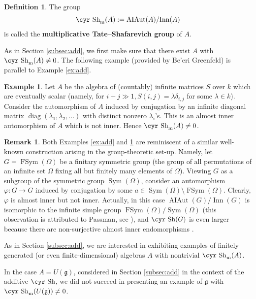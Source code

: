 \documentclass[11pt,reqno]{amsart}
\numberwithin{equation}{section}
\theoremstyle{definition}
\newtheorem{example}[theorem]{Example}
\newtheorem{definition}[theorem]{Definition}
\newtheorem{remark}[theorem]{Remark}
\newcommand{\Inner}{{\operatorname{ Inn}}}
\newcommand{\AIAut}{{\operatorname{ AIAut}}}
\newcommand{\diag}{{\operatorname{ diag}}}
\newcommand{\Sym}{{\operatorname{ Sym}}}
\newcommand{\FSym}{{\operatorname{ FSym}}}
\def\Sha{\text{\cyr Sh}}
\def\g{\mathfrak g}
\begin{document}
\begin{definition}
The group $$\Sha_{\text{\rm{m}}}(A):=\AIAut(A)/\Inner (A)$$
is called the {\bf {multiplicative Tate--Shafarevich group}} of $A$.
\end{definition}


As in Section \ref{subsec:add}, we first make sure that there exist $A$ with
$\Sha_{\text{\rm{m}}}(A)\ne 0$. The following example (provided by Be'eri
Greenfeld) is parallel to Example \ref{ex:add}.


\begin{example} \label{ex:mult}
Let $A$ be the algebra of (countably) infinite matrices $S$ over
$k$ which are eventually scalar (namely, for $i+j\gg 1, S(i,j)=\lambda \delta_{i,j}$ for some $\lambda\in k$).
Consider the automorphism of $A$ induced by conjugation by an infinite diagonal matrix
$\diag(\lambda_1,\lambda_2,\dots)$ with distinct nonzero $\lambda_i$'s.
This is an almost inner automorphism of $A$ which is not inner. Hence $\Sha_{\text{\rm{m}}}(A)\ne 0$.
\end{example}

\begin{remark}
Both Examples \ref{ex:add} and \ref{ex:mult} are reminiscent of a similar well-known construction arising in the group-theoretic
set-up. Namely, let $G=\FSym(\Omega )$ be a finitary symmetric group (the group of all permutations of an infinite set $\Omega$
fixing all but finitely many elements of $\Omega$). Viewing $G$ as a subgroup of the symmetric group $\Sym (\Omega)$, consider
an automorphism $\varphi\colon G\to G$ induced by conjugation by some $a\in \Sym (\Omega)\setminus \FSym (\Omega)$. Clearly,
$\varphi$ is almost inner but not inner. Actually, in this case $\AIAut(G)/\Inner(G)$ is isomorphic to the infinite simple group
$\FSym(\Omega)/\Sym (\Omega)$ (this observation is attributed to Passman, see \cite[Introduction]{Sah}), and  $\Sha(G)$ is even
larger because there are non-surjective almost inner endomorphisms \cite{AE}.
\end{remark}



As in Section \ref{subsec:add}, we are interested in exhibiting examples of finitely generated (or even finite-dimensional) algebras $A$
with nontrivial $\Sha_{\text{\rm{m}}}(A)$.

In the case $A=U(\g)$, considered in Section \ref{subsec:add} in the context of the additive $\Sha$,
we did not succeed in presenting an example of $\g$ with $\Sha_{\text{\rm{m}}}(U(\g))\ne 0$.
\end{document}
